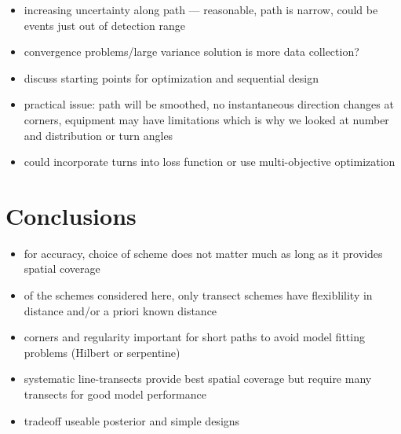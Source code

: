\documentclass[review]{elsarticle}
\begin{document}
\begin{itemize}
\item increasing uncertainty along path --- reasonable, path is narrow, could
be events just out of detection range

\item convergence problems/large variance solution is more data collection?

\item discuss starting points for optimization and sequential design

\item practical issue: path will be smoothed, no instantaneous direction
changes at corners, equipment may have limitations which is why we looked at
number and distribution or turn angles

\item could incorporate turns into loss function or use multi-objective
optimization~\citep{lark}
\end{itemize}


\section{Conclusions}

\begin{itemize}
\item for accuracy, choice of scheme does not matter much as long as it provides
spatial coverage

\item of the schemes considered here, only transect schemes have flexiblility
in distance and/or a priori known distance

\item corners and regularity important for short paths to avoid model fitting
problems (Hilbert or serpentine)

\item systematic line-transects provide best spatial coverage but require many
transects for good model performance

\item tradeoff useable posterior and simple designs
\end{itemize}


\end{document}
